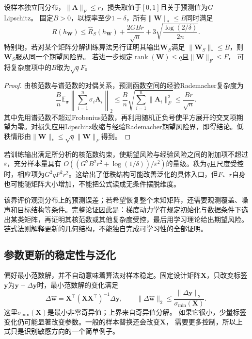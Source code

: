 \begin{theorem}[基于谱结构的矩阵预测期望风险]
\label{thm:nuclear-norm-generalization}
设样本独立同分布，$\|\bm A\|_F\leq r$，损失取值于$[0,1]$且关于预测值为$G$-Lipschitz。
固定$B>0$，以概率至少$1-\delta$，所有$\|\bm W\|_*\leq B$同时满足
\[
 R(h_{\bm W})\leq\hat R_S(h_{\bm W})
       +\frac{2GBr}{\sqrt n}
       +3\sqrt{\frac{\log(2/\delta)}{2n}}.
\]
特别地，若对某个矩阵分解训练算法另行证明其输出$\bm W_S$满足
$\|\bm W_S\|_*\leq B$，则$\bm W_S$服从同一个期望风险界。
若进一步规定$\operatorname{rank}(\bm W)\leq q$且$\|\bm W\|_F\leq F$，
可将复杂度项中的$B$取为$\sqrt qF$。
\end{theorem}
\begin{proof}
由核范数与谱范数的对偶关系，预测函数空间的经验Rademacher复杂度为
\[
 \frac Bn\mathbb E_{\bm\sigma}
       \left\|\sum_{i=1}^n\sigma_i\bm A_i\right\|_2
 \leq\frac Bn\sqrt{\sum_{i=1}^n\|\bm A_i\|_F^2}
 \leq\frac{Br}{\sqrt n}.
\]
其中先用谱范数不超过Frobenius范数，再利用随机正负号使平方展开的交叉项期望为零。对损失应用Lipschitz收缩与经验Rademacher期望风险界，即得结论。低秩情形由$\|\bm W\|_*\leq\sqrt q\|\bm W\|_F$得到。
\end{proof}

若训练输出满足所分析的核范数约束，使期望风险与经验风险之间的附加项不超过$\varepsilon$，充分样本量具有
$O((G^2B^2r^2+\log(1/\delta))/\varepsilon^2)$的量级。秩为$q$且尺度受控时，相应项为$G^2qF^2r^2$。这给出了低秩结构可能改善泛化的具体入口，但$F$、$r$自身也可能随矩阵大小增加，不能把公式读成无条件摆脱维度。

该界评价观测分布上的预测误差；若希望恢复整个未知矩阵，还需要观测覆盖、噪声和目标结构等条件。完整论证因此是：梯度动力学在规定初始化与数据条件下选出某类矩阵，再证明其核范数或其他复杂度受控，最后用学习理论给出期望风险。链式法则解释更新的几何结构，不能独自完成可学习性的全部证明。

\subsection{参数更新的稳定性与泛化}

偏好最小范数解，并不自动意味着算法对样本稳定。固定设计矩阵$\bm X$，只改变标签
$\bm y$为$\bm y+\Delta\bm y$时，最小范数解的变化满足
\[
 \Delta\hat{\bm w}=\bm X^\top(\bm X\bm X^\top)^{-1}\Delta\bm y,
 \qquad
 \|\Delta\hat{\bm w}\|_2\leq
 \frac{\|\Delta\bm y\|_2}{\sigma_{\min}(\bm X)}.
\]
这里$\sigma_{\min}(\bm X)$是最小非零奇异值；上界来自奇异值分解。
如果它很小，少量标签变化仍可能显著改变参数。一般的样本替换还会改变$\bm X$，
需要更多控制，所以上式只是识别敏感方向的一个简单例子。

